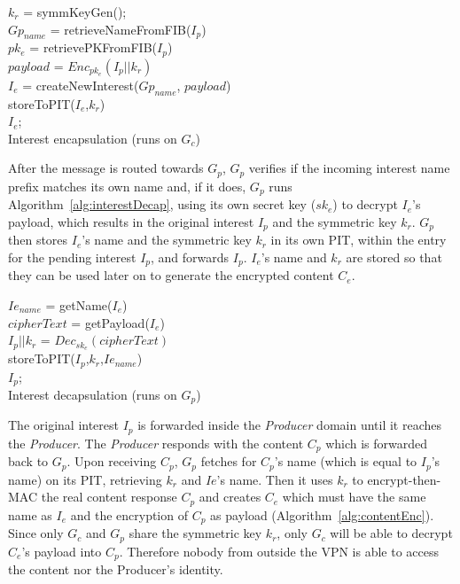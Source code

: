 \begin{algorithm}[]\label{alg:interestEncap}
$k_r$ = symmKeyGen();\\
$Gp_{name}$ = retrieveNameFromFIB($I_p$)\\
$pk_e$ = retrievePKFromFIB($I_p$)\\
$payload$ = $Enc_{pk_e}(I_p||k_r)$\\
$I_e$ = createNewInterest($Gp_{name}$, $payload$)\\
storeToPIT($I_e$,$k_r$)\\
\Return $I_e$;\\
\caption{Interest encapsulation (runs on $G_c$)}
\end{algorithm}

After the message is routed towards $G_p$, $G_p$ verifies if the incoming interest name prefix matches its own name and, if it does, $G_p$ runs Algorithm~\ref{alg:interestDecap}, using its own secret key ($sk_e$) to decrypt $I_e$'s payload, which results in the original interest $I_p$ and the symmetric key $k_r$. $G_p$ then stores $I_e$'s name and the symmetric key $k_r$ in its own PIT, within the entry for the pending interest $I_p$, and forwards $I_p$. $I_e$'s name and $k_r$ are stored so that they can be used later on to generate the encrypted content $C_e$.

\begin{algorithm}[]\label{alg:interestDecap}
$Ie_{name}$ = getName($I_e$)\\
$cipherText$ = getPayload($I_e$)\\
$I_p||k_r$ = $Dec_{sk_e}(cipherText)$\\
storeToPIT($I_p$,$k_r$,$Ie_{name}$)\\
\Return $I_p$;\\
\caption{Interest decapsulation (runs on $G_p$)}
\end{algorithm}

The original interest $I_p$ is forwarded inside the \textit{Producer} domain until it reaches the \textit{Producer}. The \textit{Producer} responds with the content $C_p$ which is forwarded back to $G_p$.
Upon receiving $C_p$, $G_p$ fetches for $C_p$'s name (which is equal to $I_p$'s name) on its PIT, retrieving $k_r$ and $Ie$'s name. Then it uses $k_r$ to encrypt-then-MAC the real content response $C_p$ and creates $C_e$ which must have the same name as $I_e$ and the encryption of $C_p$ as payload (Algorithm~\ref{alg:contentEnc}). Since only $G_c$ and $G_p$ share the symmetric key $k_r$, only $G_c$ will be able to decrypt $C_e$'s payload into $C_p$. Therefore nobody from outside the VPN is able to access the content nor the Producer's identity.

